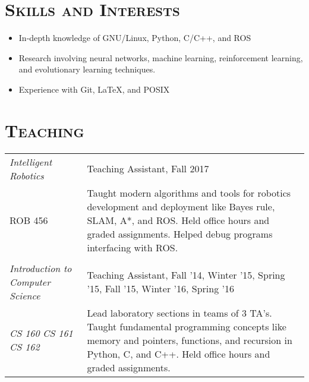 \documentclass[letterpaper,10pt,titlepage]{article}
\newcommand{\leftW}{0.28\textwidth}
\begin{document}
\section*{\textsc{Skills and Interests}}
\begin{itemize} \itemsep1pt \parskip0pt 
\item In-depth knowledge of GNU/Linux, Python, C/C++, and ROS
\item Research involving neural networks, machine learning, reinforcement learning, and evolutionary learning techniques.
\item Experience with Git, \LaTeX, and POSIX
\end{itemize}


\section*{\textsc{Teaching}}
\begin{tabularx}{\linewidth}{p{\leftW}X}
	\textit{Intelligent Robotics}&Teaching Assistant, Fall 2017\\
	ROB 456 & Taught modern algorithms and tools for robotics development and deployment like Bayes rule, SLAM, A*, and ROS. Held office hours and graded assignments. Helped debug programs interfacing with ROS. \\
	&\\
	\textit{Introduction to Computer Science} & Teaching Assistant, Fall '14, Winter '15, Spring '15, Fall '15, Winter '16, Spring '16\\
	\textit{CS 160} \textit{CS 161} \textit{CS 162} &  Lead laboratory sections in teams of 3 TA's. Taught fundamental programming concepts like memory and pointers, functions, and recursion in Python, C, and C++. Held office hours and graded assignments.
\end{tabularx}
\end{document}
